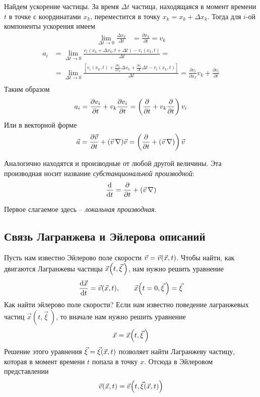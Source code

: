 Найдем ускорение частицы. За время $ \Delta t $ частица, находящаяся в момент времени $t$ в точке с координатами $ x_{k} $, переместится в точку $ x_{k}=x_{k}+\Delta x_{k} $. Тогда для $i$-ой компоненты ускорения имеем
\begin{align*} 
\lim _{\Delta t \rightarrow 0} \frac{\Delta x_{k}}{\Delta t} &=\frac{\partial x_{k}}{\partial t}=v_{k} 
\end{align*}
\begin{align*}
a_{i} &=\lim _{\Delta t \rightarrow 0} \frac{v_{i}\left(x_{k}+\Delta x_{k}, t+\Delta t\right)-v_{i}\left(x_{k}, t\right)}{\Delta t} = \\
&=\lim _{\Delta t \rightarrow 0}\frac{\left[v_{i}\left(x_{k}, t\right)+\frac{\partial v_{i}}{\partial x_{k}} \Delta x_{k}+\frac{\partial v_{i}}{\partial t}\Delta t-v_{i}\left(x_{k}, t\right)\right]}{\Delta t} =\frac{\partial v_{i}}{\partial x_{k}} v_{k}+\frac{\partial v_{i}}{\partial t} \\
\end{align*}
Таким образом 
\begin{align*} 
a_{i} =\frac{\partial v_{i}}{\partial t}+v_{k} \frac{\partial v_{i}}{\partial t}=\left(\pdv{t}+v_{k} \pdv{t}\right) v_{i}
\end{align*}
Или в векторной форме
\begin{equation}
	\vec{a} =\frac{\partial \vec{v}}{\partial t}+(\vec{v}\,\nabla) \vec{v}=\left(\pdv{t}+(\vec{v}\,\nabla)\right) \vec{v}
\end{equation}

Аналогично находятся и производные от любой другой величины. Эта производная носит название \textit{субстанциональной производной}:
\begin{align*} 
\dv{t}=\pdv{t}+(\vec{v}\,\nabla)
\end{align*}

Первое слагаемое здесь -- \textit{локальная производная}.


\subsection{Связь Лагранжева и Эйлерова описаний}
Пусть нам известно Эйлерово поле скорости $ \vec{v}=\vec{v}\qty(\vec{x}, t) $. Чтобы найти, как двигаются Лагранжевы частицы $ \vec{x}\qty(t, \vec{\xi}\,) $, нам нужно решить уравнение
\begin{align*} 
\dv{\vec{x}}{t}=\vec{v}\qty(\vec{x}, t), \qquad
\vec{x}\qty(t=0, \vec{\xi}\,)=\vec{\xi}
\end{align*}
Как найти эйлерово поле скорости? Если нам известно поведение лагранжевых частиц $ \vec{x}(t, \vec{\xi}\,) $, то вначале нам нужно решить уравнение 
\begin{align*} 
\vec{x}=\vec{x}\qty(t, \vec{\xi}\,)
\end{align*}
Решение этого уравнения $\vec{\xi}=\vec{\xi}\qty(\vec{x}, t)$
позволяет найти Лагранжеву частицу, которая в момент времени $t$ попала в точку $x$. Отсюда в Эйлеровом представлении
\begin{align*} 
\vec{v}(\vec{x}, t)=\vec{v}\qty(t, \vec{\xi}(\vec{x}, t))
\end{align*}




